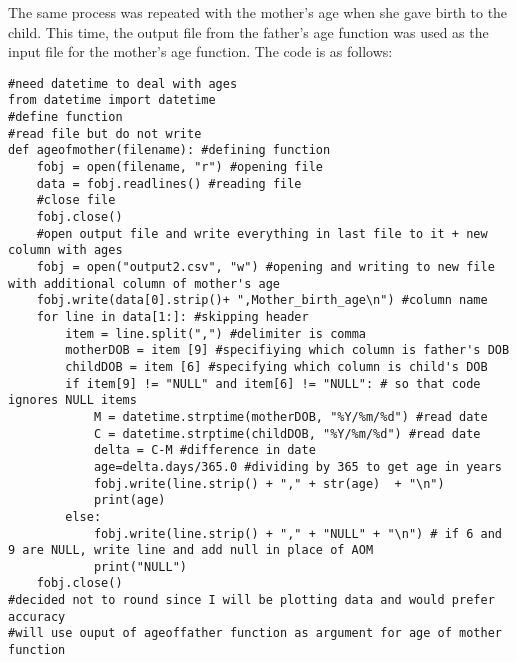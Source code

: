 \documentclass{article}
\begin{document}
The same process was repeated with the mother's age when she gave birth to the child. This time, the output file from the father's age function was used as the input file for the mother's age function. The code is as follows: 

\begin{verbatim}
#need datetime to deal with ages
from datetime import datetime
#define function
#read file but do not write
def ageofmother(filename): #defining function
    fobj = open(filename, "r") #opening file
    data = fobj.readlines() #reading file
    #close file
    fobj.close()
    #open output file and write everything in last file to it + new column with ages
    fobj = open("output2.csv", "w") #opening and writing to new file with additional column of mother's age
    fobj.write(data[0].strip()+ ",Mother_birth_age\n") #column name
    for line in data[1:]: #skipping header
        item = line.split(",") #delimiter is comma
        motherDOB = item [9] #specifiying which column is father's DOB
        childDOB = item [6] #specifying which column is child's DOB
        if item[9] != "NULL" and item[6] != "NULL": # so that code ignores NULL items
            M = datetime.strptime(motherDOB, "%Y/%m/%d") #read date
            C = datetime.strptime(childDOB, "%Y/%m/%d") #read date
            delta = C-M #difference in date
            age=delta.days/365.0 #dividing by 365 to get age in years
            fobj.write(line.strip() + "," + str(age)  + "\n")
            print(age)
        else:
            fobj.write(line.strip() + "," + "NULL" + "\n") # if 6 and 9 are NULL, write line and add null in place of AOM
            print("NULL")
    fobj.close()
#decided not to round since I will be plotting data and would prefer accuracy
#will use ouput of ageoffather function as argument for age of mother function
\end{verbatim}
\end{document}
